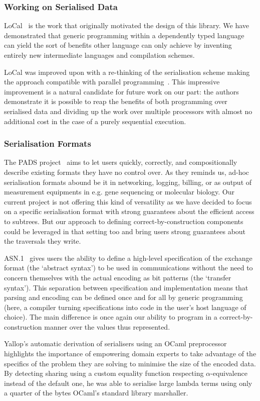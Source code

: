 \subsubsection{Working on Serialised Data}

LoCal~\cite{DBLP:conf/pldi/VollmerKRS0N19} is the work that originally
motivated the design of this library.
%
We have demonstrated that generic programming within a dependently typed
language can yield the sort of benefits other language can only achieve
by inventing entirely new intermediate languages and compilation schemes.

LoCal was improved upon with a re-thinking of the serialisation scheme
making the approach compatible with parallel
programming~\cite{DBLP:journals/pacmpl/KoparkarRVKN21}.
This impressive improvement is a natural candidate for future work on our
part: the authors demonstrate it is possible to reap the benefits of
both programming over serialised data
and dividing up the work over multiple processors
with almost no additional cost in the case of a purely sequential execution.

\subsubsection{Serialisation Formats}

The PADS project~\cite{DBLP:conf/popl/MandelbaumFWFG07} aims to let users
quickly, correctly, and compositionally describe existing formats they
have no control over.
%
As they reminds us, ad-hoc serialisation formats abound be it in
networking, logging, billing, or as output of measurement equipments
in e.g. gene sequencing or molecular biology.
%
Our current project is not offering this kind of versatility as we have
decided to focus on a specific serialisation format with strong
guarantees about the efficient access to subtrees.
%
But our approach to defining correct-by-construction components could
be leveraged in that setting too and bring users strong guarantees about
the traversals they write.

ASN.1~\cite{MANUAL:book/larmouth1999} gives users the ability to define
a high-level specification of the exchange format (the `abstract syntax')
to be used in communications without the need to concern themselves with
the actual encoding as bit patterns (the `transfer syntax').
%
This separation between specification and implementation means that parsing
and encoding can be defined once and for all by generic programming
(here, a compiler turning specifications into code in the user's host
language of choice).
%
The main difference is once again our ability to program in a
correct-by-construction manner over the values thus represented.


Yallop's automatic derivation of serialisers using an OCaml
preprocessor~\cite{DBLP:conf/ml/Yallop07} highlights the importance
of empowering domain experts to take advantage of the specifics of
the problem they are solving to minimise the size of the encoded data.
%
By detecting sharing using a custom equality function respecting
$\alpha$-equivalence instead of the default one, he was able to
serialise large lambda terms using only
a quarter of the bytes OCaml's standard library marshaller.

